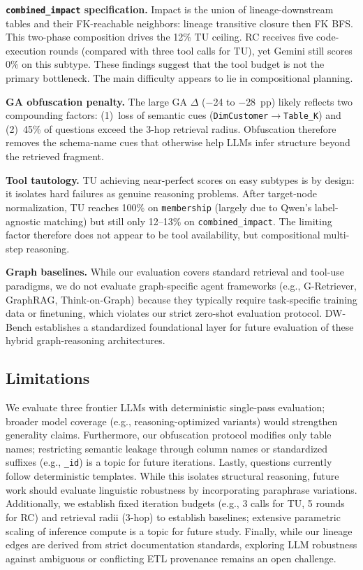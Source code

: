\textbf{\texttt{combined\_impact} specification.}
Impact is the union of lineage-downstream tables and their FK-reachable
neighbors: lineage transitive closure then FK BFS.  This two-phase
composition drives the 12\% TU ceiling.
RC receives five code-execution rounds
(compared with three tool calls for TU), yet Gemini still scores 0\%
on this subtype. These findings suggest that the 
tool budget is not the primary
bottleneck. The main difficulty appears to lie in
compositional planning.

\textbf{GA obfuscation penalty.}
The large GA $\Delta$ ($-$24 to $-$28~pp) likely reflects two compounding
factors: (1)~loss of semantic cues
(\texttt{DimCustomer}$\to$\texttt{Table\_K}) and (2)~45\% of questions
exceed the 3-hop retrieval radius. Obfuscation
therefore removes the schema-name cues that otherwise help LLMs infer
structure beyond the retrieved fragment.

\begin{sloppypar}
\textbf{Tool tautology.}
TU achieving near-perfect scores on easy subtypes is by design: it
isolates hard failures as genuine reasoning problems.  After
target-node normalization, TU reaches 100\% on \texttt{membership}
(largely due to Qwen's label-agnostic matching) but still
only 12--13\% on \texttt{combined\_impact}.  The limiting
factor therefore does not appear to be tool availability, but
compositional multi-step reasoning.
\end{sloppypar}

\textbf{Graph baselines.}
While our evaluation covers standard retrieval and tool-use paradigms, we
do not evaluate graph-specific agent frameworks (e.g., G-Retriever,
GraphRAG, Think-on-Graph) because they typically require task-specific
training data or finetuning, which violates our strict zero-shot
evaluation protocol. DW-Bench establishes a standardized foundational
layer for future evaluation of these hybrid graph-reasoning architectures.

\subsection{Limitations}

We evaluate three frontier LLMs with deterministic single-pass evaluation;
broader model coverage (e.g., reasoning-optimized variants) would
strengthen generality claims. Furthermore, our obfuscation protocol modifies
only table names; restricting semantic leakage through column names or
standardized suffixes (e.g., \texttt{\_id}) is a topic for future iterations.
Lastly, questions currently follow deterministic templates. While this isolates
structural reasoning, future work should evaluate linguistic robustness
by incorporating paraphrase variations. Additionally, we establish fixed
iteration budgets (e.g., 3 calls for TU, 5 rounds for RC) and retrieval radii (3-hop)
to establish baselines; extensive parametric scaling of inference compute is a topic
for future study. Finally, while our lineage edges are derived from strict documentation
standards, exploring LLM robustness against ambiguous or conflicting ETL provenance
remains an open challenge.

